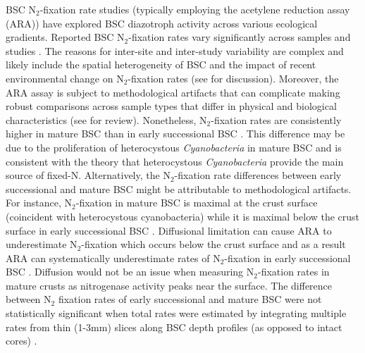 BSC N$_{2}$-fixation rate studies (typically employing the acetylene reduction
assay (ARA)) have explored BSC diazotroph activity across various ecological
gradients. Reported BSC N$_{2}$-fixation rates vary significantly across
samples and studies \citep{Evans_2001}.  The reasons for inter-site and
inter-study variability are complex and likely include the spatial
heterogeneity of BSC \citep{Evans_2001} and the impact of recent environmental
change on N$_{2}$-fixation rates (see \citet{Belnap_2001} for discussion).
Moreover, the ARA assay is subject to methodological artifacts that can
complicate making robust comparisons across sample types that differ in
physical and biological characteristics (see \citet{Belnap_2001} for review).
Nonetheless, N$_{2}$-fixation rates are consistently higher in mature BSC than
in early successional BSC \citep{Belnap_2002, 14766579}. This difference
may be due to the proliferation of heterocystous \textit{Cyanobacteria} in
mature BSC and is consistent with the theory that heterocystous
\textit{Cyanobacteria} provide the main source of fixed-N.
Alternatively, the N$_{2}$-fixation rate differences between early
successional and mature BSC might be attributable to methodological artifacts.
For instance, N$_{2}$-fixation in mature BSC is maximal at the crust surface
(coincident with heterocystous cyanobacteria) while it is maximal below the
crust surface in early successional BSC \citep{15643930}. Diffusional
limitation can cause ARA to underestimate N$_{2}$-fixation which
occurs below the crust surface and as a result ARA can systematically
underestimate rates of N$_{2}$-fixation in early successional BSC
\citep{15643930}. Diffusion would not be an issue when measuring
N$_{2}$-fixation rates in mature crusts as nitrogenase activity peaks near the
surface.  The difference between N$_{2}$ fixation rates of early
successional and mature BSC were not statistically significant when
total rates were estimated by integrating multiple rates from
thin (1-3mm) slices along BSC depth profiles (as opposed to 
intact cores) \citep{15643930}.

